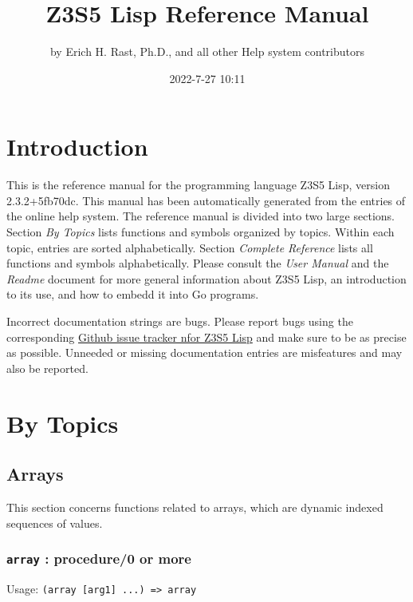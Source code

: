 \documentclass[
]{article}
\title{Z3S5 Lisp Reference Manual}
\author{by Erich H. Rast, Ph.D., and all other Help system contributors}
\date{2022-7-27 10:11}
\newcommand{\passthrough}[1]{#1}
\begin{document}
\maketitle

\hypertarget{introduction}{%
\section{Introduction}\label{introduction}}

This is the reference manual for the programming language Z3S5 Lisp,
version 2.3.2+5fb70dc. This manual has been automatically generated from
the entries of the online help system. The reference manual is divided
into two large sections. Section \emph{By Topics} lists functions and
symbols organized by topics. Within each topic, entries are sorted
alphabetically. Section \emph{Complete Reference} lists all functions
and symbols alphabetically. Please consult the \emph{User Manual} and
the \emph{Readme} document for more general information about Z3S5 Lisp,
an introduction to its use, and how to embedd it into Go programs.

Incorrect documentation strings are bugs. Please report bugs using the
corresponding \href{https://github.com/rasteric/z3s5-lisp/issues}{Github
issue tracker nfor Z3S5 Lisp} and make sure to be as precise as
possible. Unneeded or missing documentation entries are misfeatures and
may also be reported.

\hypertarget{by-topics}{%
\section{By Topics}\label{by-topics}}

\hypertarget{arrays}{%
\subsection{Arrays}\label{arrays}}

This section concerns functions related to arrays, which are dynamic
indexed sequences of values.

\hypertarget{array-procedure0-or-more}{%
\subsubsection{\texorpdfstring{\texttt{array} : procedure/0 or
more}{array : procedure/0 or more}}\label{array-procedure0-or-more}}

Usage: \passthrough{\lstinline!(array [arg1] ...) => array!}
\end{document}
